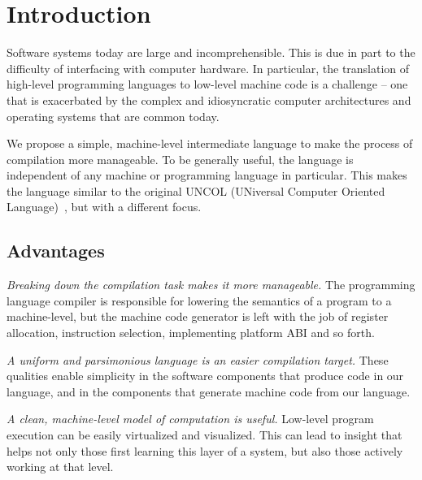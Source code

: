 \section{Introduction}

Software systems today are large and incomprehensible.
This is due in part to the difficulty
of interfacing with computer hardware.
In particular, the translation of high-level programming
languages to low-level machine code
is a challenge -- one that is exacerbated by
the complex and idiosyncratic
computer architectures and operating systems that are common today.

We propose a simple, machine-level intermediate language to make
the process of compilation more manageable.
To be generally useful, the language is independent of any
machine or programming language in particular.
This makes the language similar to the original
UNCOL (UNiversal Computer Oriented Language)~\cite{strong1958problem},
but with a different focus.

\subsection{Advantages}

\emph{Breaking down the compilation task makes it more manageable.}
The programming language compiler is responsible for
lowering the semantics of a program to a machine-level,
but the machine code generator is left with the job of register allocation,
instruction selection, implementing platform ABI and so forth.

\emph{A uniform and parsimonious language is an easier compilation target.}
These qualities enable simplicity in the software components that
produce code in our language, and in the components that %
generate machine code from our language.

\emph{A clean, machine-level model of computation is useful.}
Low-level program execution can be easily virtualized and visualized.
This can lead to insight that helps not only those first learning
this layer of a system, but also those actively working at that level.

